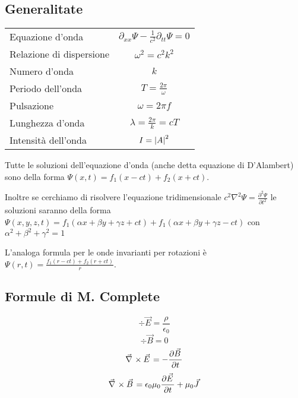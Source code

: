 \documentclass[10pt,a4paper]{article}
\begin{document}
\begin{multicols}{2}
  \subsection*{Generalitate}
  \begin{tabular}{lc}
    Equazione d'onda         & $\partial_{xx} \Psi - \frac{1}{c^2} \partial_{tt} \Psi = 0$ \\
    Relazione di dispersione & $\omega^2 = c^2 k^2$                                        \\
    Numero d'onda            & $k$                                                         \\
    Periodo dell'onda        & $T = \frac{2 \pi}{\omega}$                                  \\
    Pulsazione               & $\omega = 2 \pi f$                                          \\
    Lunghezza d'onda         & $\lambda = \frac{2 \pi}{k} = cT$                            \\
    Intensità dell'onda      & $I = \left|{A}\right|^2$                                             \\
  \end{tabular}

  \begin{paragrafo}
    Tutte le soluzioni dell'equazione d'onda (anche detta equazione di D'Alambert) sono della forma $\Psi(x, t) = f_1(x - ct) + f_2(x + ct)$.

    Inoltre se cerchiamo di risolvere l'equazione tridimensionale $c^2 \nabla^2 \Psi = \frac{\partial^2 \Psi}{\partial t^2}$ le soluzioni saranno della forma $\Psi(x, y, z, t) = f_1(\alpha x + \beta y + \gamma z + ct) + f_1(\alpha x + \beta y + \gamma z - ct)$ con $\alpha^2 + \beta^2 + \gamma^2 = 1$

    L'analoga formula per le onde invarianti per rotazioni è $\Psi(r, t) = \frac{f_1(r - ct) + f_2(r + ct)}{r}$.
  \end{paragrafo}

  \subsection*{Formule di M. Complete}
  \begin{equation*}
    \div {\vec E} = \frac{\rho}{\epsilon_0}
  \end{equation*}
  \begin{equation*}
    \div {\vec B} = 0
  \end{equation*}
  \begin{equation*}
    \rot {\vec E} = - \dep{\vec B}{t}
  \end{equation*}
  \begin{equation*}
    \rot {\vec B} = \epsilon_0 \mu_0 \dep{\vec E}{t} + \mu_0 \vec J
  \end{equation*}


\end{multicols}
\end{document}
